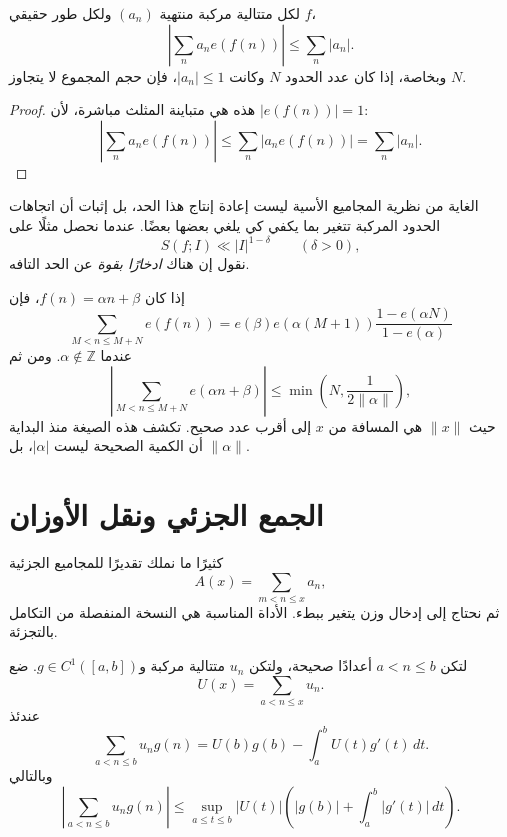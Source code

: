 \begin{proposition}
\label{prop:exp-trivial-bound}
لكل متتالية مركبة منتهية \((a_n)\) ولكل طور حقيقي \(f\)،
\[
\left|\sum_n a_n e(f(n))\right|
\le
\sum_n |a_n|.
\]
وبخاصة، إذا كان عدد الحدود \(N\) وكانت \(|a_n|\le1\)، فإن حجم المجموع لا يتجاوز \(N\).
\provedhere
\end{proposition}

\begin{proof}
هذه هي متباينة المثلث مباشرة، لأن \(|e(f(n))|=1\):
\[
\left|\sum_n a_n e(f(n))\right|
\le
\sum_n |a_n e(f(n))|
=
\sum_n|a_n|.
\]
\end{proof}

الغاية من نظرية المجاميع الأسية ليست إعادة إنتاج هذا الحد، بل إثبات أن اتجاهات الحدود المركبة تتغير بما يكفي كي يلغي بعضها بعضًا. عندما نحصل مثلًا على
\[
S(f;I)\ll |I|^{1-\delta}
\qquad(\delta>0),
\]
نقول إن هناك \emph{ادخارًا بقوة} عن الحد التافه.

\begin{example}
إذا كان \(f(n)=\alpha n+\beta\)، فإن
\[
\sum_{M<n\le M+N}e(f(n))
=e(\beta)e(\alpha(M+1))
\frac{1-e(\alpha N)}{1-e(\alpha)}
\]
عندما \(\alpha\notin\mathbb Z\). ومن ثم
\[
\left|\sum_{M<n\le M+N}e(\alpha n+\beta)\right|
\le
\min\!\left(N,\frac{1}{2\|\alpha\|}\right),
\]
حيث \(\|x\|\) هي المسافة من \(x\) إلى أقرب عدد صحيح. تكشف هذه الصيغة منذ البداية أن الكمية الصحيحة ليست \(|\alpha|\)، بل \(\|\alpha\|\).
\end{example}

\section{الجمع الجزئي ونقل الأوزان}

كثيرًا ما نملك تقديرًا للمجاميع الجزئية
\[
A(x)=\sum_{m<n\le x}a_n,
\]
ثم نحتاج إلى إدخال وزن يتغير ببطء. الأداة المناسبة هي النسخة المنفصلة من التكامل بالتجزئة.

\begin{lemma}
\label{lem:exp-partial-summation}
لتكن \(a<n\le b\) أعدادًا صحيحة، ولتكن \(u_n\) متتالية مركبة و\(g\in C^1([a,b])\). ضع
\[
U(x)=\sum_{a<n\le x}u_n.
\]
عندئذ
\[
\sum_{a<n\le b}u_n g(n)
=U(b)g(b)-\int_a^b U(t)g'(t)\,dt.
\]
وبالتالي
\[
\left|\sum_{a<n\le b}u_n g(n)\right|
\le
\sup_{a\le t\le b}|U(t)|
\left(|g(b)|+\int_a^b|g'(t)|\,dt\right).
\]
\provedhere
\end{lemma}

